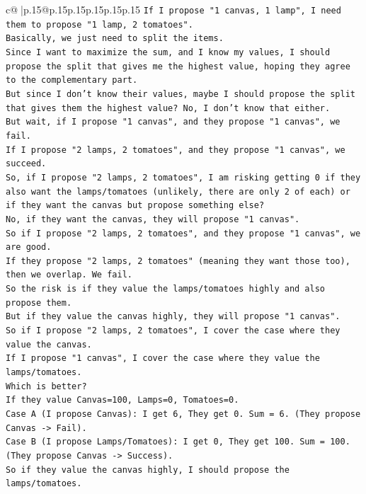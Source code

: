 \documentclass{article}
\begin{document}
{\begin{supertabular}{c@{$\;$}|p{.15\linewidth}@{}p{.15\linewidth}p{.15\linewidth}p{.15\linewidth}p{.15\linewidth}p{.15\linewidth}}
{{{\texttt{If I propose "1 canvas, 1 lamp", I need them to propose "1 lamp, 2 tomatoes".} \\
\texttt{Basically, we just need to split the items.} \\
\texttt{Since I want to maximize the sum, and I know my values, I should propose the split that gives me the highest value, hoping they agree to the complementary part.} \\
\texttt{But since I don't know their values, maybe I should propose the split that gives them the highest value? No, I don't know that either.} \\
\texttt{But wait, if I propose "1 canvas", and they propose "1 canvas", we fail.} \\
\texttt{If I propose "2 lamps, 2 tomatoes", and they propose "1 canvas", we succeed.} \\
\texttt{So, if I propose "2 lamps, 2 tomatoes", I am risking getting 0 if they also want the lamps/tomatoes (unlikely, there are only 2 of each) or if they want the canvas but propose something else?} \\
\texttt{No, if they want the canvas, they will propose "1 canvas".} \\
\texttt{So if I propose "2 lamps, 2 tomatoes", and they propose "1 canvas", we are good.} \\
\texttt{If they propose "2 lamps, 2 tomatoes" (meaning they want those too), then we overlap. We fail.} \\
\texttt{So the risk is if they value the lamps/tomatoes highly and also propose them.} \\
\texttt{But if they value the canvas highly, they will propose "1 canvas".} \\
\texttt{So if I propose "2 lamps, 2 tomatoes", I cover the case where they value the canvas.} \\
\texttt{If I propose "1 canvas", I cover the case where they value the lamps/tomatoes.} \\
\texttt{Which is better?} \\
\texttt{If they value Canvas=100, Lamps=0, Tomatoes=0.} \\
\texttt{Case A (I propose Canvas): I get 6, They get 0. Sum = 6. (They propose Canvas {-}> Fail).} \\
\texttt{Case B (I propose Lamps/Tomatoes): I get 0, They get 100. Sum = 100. (They propose Canvas {-}> Success).} \\
\texttt{So if they value the canvas highly, I should propose the lamps/tomatoes.} \\
}}}
\end{supertabular}}
\end{document}

